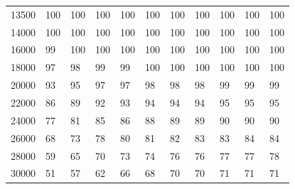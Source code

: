 \documentclass[a4paper, 10pt]{article}
\begin{document}
\begin{table}[!tbp]
\begin{center}
\begin{tabular}{lllllllllll}
13500&\cellcolor{gray50} 100&\cellcolor{gray50} 100&\cellcolor{gray50} 100&\cellcolor{gray50} 100&\cellcolor{gray50} 100&\cellcolor{gray50} 100&\cellcolor{gray50} 100&\cellcolor{gray50} 100&\cellcolor{gray50} 100&\cellcolor{gray50} 100\tabularnewline
14000&\cellcolor{gray50} 100&\cellcolor{gray50} 100&\cellcolor{gray50} 100&\cellcolor{gray50} 100&\cellcolor{gray50} 100&\cellcolor{gray50} 100&\cellcolor{gray50} 100&\cellcolor{gray50} 100&\cellcolor{gray50} 100&\cellcolor{gray50} 100\tabularnewline
16000&\cellcolor{gray50} 99&\cellcolor{gray50} 100&\cellcolor{gray50} 100&\cellcolor{gray50} 100&\cellcolor{gray50} 100&\cellcolor{gray50} 100&\cellcolor{gray50} 100&\cellcolor{gray50} 100&\cellcolor{gray50} 100&\cellcolor{gray50} 100\tabularnewline
18000&\cellcolor{gray50} 97&\cellcolor{gray50} 98&\cellcolor{gray50} 99&\cellcolor{gray50} 99&\cellcolor{gray50} 100&\cellcolor{gray50} 100&\cellcolor{gray50} 100&\cellcolor{gray50} 100&\cellcolor{gray50} 100&\cellcolor{gray50} 100\tabularnewline
20000&\cellcolor{gray50} 93&\cellcolor{gray50} 95&\cellcolor{gray50} 97&\cellcolor{gray50} 97&\cellcolor{gray50} 98&\cellcolor{gray50} 98&\cellcolor{gray50} 98&\cellcolor{gray50} 99&\cellcolor{gray50} 99&\cellcolor{gray50} 99\tabularnewline
22000&\cellcolor{gray60} 86&\cellcolor{gray60} 89&\cellcolor{gray50} 92&\cellcolor{gray50} 93&\cellcolor{gray50} 94&\cellcolor{gray50} 94&\cellcolor{gray50} 94&\cellcolor{gray50} 95&\cellcolor{gray50} 95&\cellcolor{gray50} 95\tabularnewline
24000&\cellcolor{gray70} 77&\cellcolor{gray60} 81&\cellcolor{gray60} 85&\cellcolor{gray60} 86&\cellcolor{gray60} 88&\cellcolor{gray60} 89&\cellcolor{gray60} 89&\cellcolor{gray60} 90&\cellcolor{gray60} 90&\cellcolor{gray60} 90\tabularnewline
26000&\cellcolor{gray80} 68&\cellcolor{gray70} 73&\cellcolor{gray70} 78&\cellcolor{gray70} 80&\cellcolor{gray60} 81&\cellcolor{gray60} 82&\cellcolor{gray60} 83&\cellcolor{gray60} 83&\cellcolor{gray60} 84&\cellcolor{gray60} 84\tabularnewline
28000&\cellcolor{gray90} 59&\cellcolor{gray80} 65&\cellcolor{gray80} 70&\cellcolor{gray70} 73&\cellcolor{gray70} 74&\cellcolor{gray70} 76&\cellcolor{gray70} 76&\cellcolor{gray70} 77&\cellcolor{gray70} 77&\cellcolor{gray70} 78\tabularnewline
30000&\cellcolor{gray90} 51&\cellcolor{gray90} 57&\cellcolor{gray80} 62&\cellcolor{gray80} 66&\cellcolor{gray80} 68&\cellcolor{gray80} 70&\cellcolor{gray70} 70&\cellcolor{gray70} 71&\cellcolor{gray70} 71&\cellcolor{gray70} 71\tabularnewline
\hline
\end{tabular}
\end{center}
\end{table}
\end{document}
